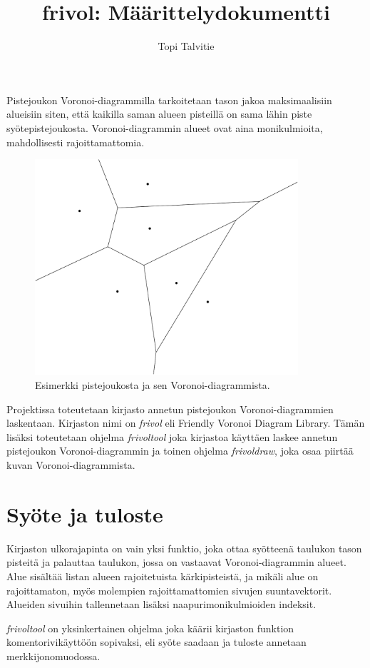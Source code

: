 \documentclass[a4paper, 11pt, finnish]{article}
\author{Topi Talvitie}
\title{frivol: Määrittelydokumentti}
\begin{document}
\maketitle

Pistejoukon Voronoi-diagrammilla tarkoitetaan tason jakoa maksimaalisiin alueisiin siten, että kaikilla saman alueen pisteillä on sama lähin piste syötepistejoukosta. Voronoi-diagrammin alueet ovat aina monikulmioita, mahdollisesti rajoittamattomia.

\begin{figure}[h]
\centering
\includegraphics[height=8cm]{esim-crop}
\caption{Esimerkki pistejoukosta ja sen Voronoi-diagrammista.}
\end{figure}

Projektissa toteutetaan kirjasto annetun pistejoukon Voronoi-diagrammien laskentaan. Kirjaston nimi on \emph{frivol} eli Friendly Voronoi Diagram Library. Tämän lisäksi toteutetaan ohjelma \emph{frivoltool} joka kirjastoa käyttäen laskee annetun pistejoukon Voronoi-diagrammin ja toinen ohjelma \emph{frivoldraw}, joka osaa piirtää kuvan Voronoi-diagrammista.

\section*{Syöte ja tuloste}
Kirjaston ulkorajapinta on vain yksi funktio, joka ottaa syötteenä taulukon tason pisteitä ja palauttaa taulukon, jossa on vastaavat Voronoi-diagrammin alueet. Alue sisältää listan alueen rajoitetuista kärkipisteistä, ja mikäli alue on rajoittamaton, myös molempien rajoittamattomien sivujen suuntavektorit. Alueiden sivuihin tallennetaan lisäksi naapurimonikulmioiden indeksit.

\emph{frivoltool} on yksinkertainen ohjelma joka käärii kirjaston funktion komentorivikäyttöön sopivaksi, eli syöte saadaan ja tuloste annetaan merkkijonomuodossa.
\end{document}
